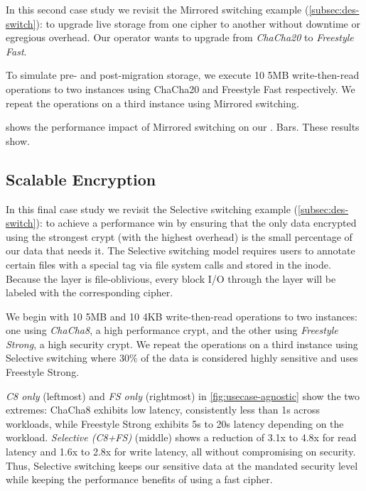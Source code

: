 In this second case study we revisit the Mirrored switching example
(\cref{subsec:des-switch}): to upgrade live storage from one cipher to another
without downtime or egregious overhead. Our operator wants to upgrade from {\em
ChaCha20} to {\em Freestyle Fast}.

To simulate pre- and post-migration storage, we execute 10 5MB write-then-read
operations to two \sys instances using ChaCha20 and Freestyle Fast respectively.
We repeat the operations on a third instance using Mirrored switching.



 shows the performance impact of Mirrored switching
on our . Bars. These results show.


\subsection{Scalable Encryption}\label{subsec:usecase-agnostic}

In this final case study we revisit the Selective switching example
(\cref{subsec:des-switch}): to achieve a performance win by ensuring that the
only data encrypted using the strongest crypt (with the highest overhead) is the
small percentage of our data that needs it. The Selective switching model
requires users to annotate certain files with a special tag via file system
calls and stored in the inode. Because the \sys layer is file-oblivious, every
block I/O through the \sys layer will be labeled with the corresponding cipher.

We begin with 10 5MB and 10 4KB write-then-read operations to two \sys
instances: one using {\em ChaCha8}, a high performance crypt, and the other
using {\em Freestyle Strong}, a high security crypt. We repeat the operations on
a third instance using Selective switching where 30\% of the data is considered
highly sensitive and uses Freestyle Strong.



{\em C8 only} (leftmost) and {\em FS only} (rightmost) in
\cref{fig:usecase-agnostic} show the two extremes: ChaCha8 exhibits low latency,
consistently less than 1s across workloads, while Freestyle Strong exhibits 5s
to 20s latency depending on the workload. {\em Selective (C8+FS)} (middle) shows
a reduction of 3.1x to 4.8x for read latency and 1.6x to 2.8x for write latency,
all without compromising on security. Thus, Selective switching keeps our
sensitive data at the mandated security level while keeping the performance
benefits of using a fast cipher.
